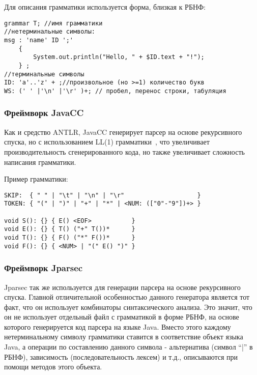Для описания грамматики используется форма, близкая к РБНФ:

\begin{lstlisting}[caption={Пример грамматики, используемой в средстве ANTLR}]
 grammar T; //имя грамматики
//нетерминальные символы:
msg : 'name' ID ';'
    {
        System.out.println("Hello, " + $ID.text + "!");
    } ;
//терминальные символы
ID: 'a'..'z' + ;//произвольное (но >=1) количество букв
WS: (' ' |'\n' |'\r' )+; // пробел, перенос строки, табуляция
\end{lstlisting}

\subsubsection{Фреймворк JavaCC}

Как и средство ANTLR, JavaCC генерирует парсер на основе рекурсивного спуска, но
с использованием LL(1) грамматики~\cite{journals/csr/Mahmoud13}, что увеличивает
производительность сгенерированного кода, но также увеличивает сложность
написания грамматики.

Пример грамматики:

\begin{lstlisting}[caption={Пример грамматики, используемой в средстве JavaCC}]
SKIP:  { " " | "\t" | "\n" | "\r"                    }
TOKEN: { "(" | ")" | "+" | "*" | <NUM: (["0"-"9"])+> }

void S(): {} { E() <EOF>           }
void E(): {} { T() ("+" T())*      }
void T(): {} { F() ("*" F())*      }
void F(): {} { <NUM> | "(" E() ")" }
\end{lstlisting}

\subsubsection{Фреймворк Jparsec}

Jparsec так же используется для генерации парсера на основе рекурсивного спуска.
Главной отличительной особенностью данного генератора является тот факт, что он
использует комбинаторы синтаксического анализа. Это значит, что он не использует
отдельный файл с грамматикой в форме РБНФ, на основе которого генерируется код
парсера на языке Java. Вместо этого каждому нетерминальному символу грамматики
ставится в соответствие объект языка Java, а операции по составлению данного
символа - альтернатива (символ ``|'' в РБНФ), зависимость (последовательность
лексем) и т.д., описываются при помощи методов этого объекта.


